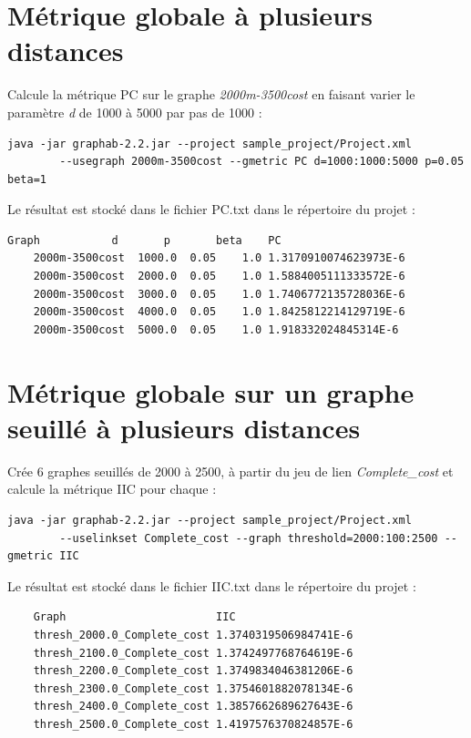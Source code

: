 \documentclass[a4paper,10pt]{report}
\begin{document}
\section{Métrique globale à plusieurs distances}
Calcule la métrique PC sur le graphe \textit{2000m-3500cost} en faisant varier le paramètre \textit{d} de 1000 à 5000 par pas de 1000 :
\begin{Verbatim}[tabsize=4]
	java -jar graphab-2.2.jar --project sample_project/Project.xml
		--usegraph 2000m-3500cost --gmetric PC d=1000:1000:5000 p=0.05 beta=1
\end{Verbatim}
Le résultat est stocké dans le fichier PC.txt dans le répertoire du projet :
\begin{Verbatim}[tabsize=4]
	Graph         	d     	p   	beta	PC
	2000m-3500cost	1000.0	0.05	1.0	1.3170910074623973E-6
	2000m-3500cost	2000.0	0.05	1.0	1.5884005111333572E-6
	2000m-3500cost	3000.0	0.05	1.0	1.7406772135728036E-6
	2000m-3500cost	4000.0	0.05	1.0	1.8425812214129719E-6
	2000m-3500cost	5000.0	0.05	1.0	1.918332024845314E-6
\end{Verbatim}

\section{Métrique globale sur un graphe seuillé à plusieurs distances}
Crée 6 graphes seuillés de 2000 à 2500, à partir du jeu de lien \textit{Complete\_cost} et calcule la métrique IIC pour chaque :
\begin{Verbatim}[tabsize=4]
	java -jar graphab-2.2.jar --project sample_project/Project.xml
		--uselinkset Complete_cost --graph threshold=2000:100:2500 --gmetric IIC
\end{Verbatim}
Le résultat est stocké dans le fichier IIC.txt dans le répertoire du projet :
\begin{Verbatim}
	Graph                      	IIC
	thresh_2000.0_Complete_cost	1.3740319506984741E-6
	thresh_2100.0_Complete_cost	1.3742497768764619E-6
	thresh_2200.0_Complete_cost	1.3749834046381206E-6
	thresh_2300.0_Complete_cost	1.3754601882078134E-6
	thresh_2400.0_Complete_cost	1.3857662689627643E-6
	thresh_2500.0_Complete_cost	1.4197576370824857E-6
\end{Verbatim}
\end{document}
